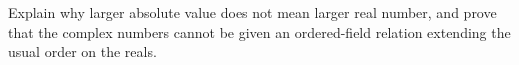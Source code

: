 Explain why larger absolute value does not mean larger real number, and prove that the complex numbers cannot be given an ordered-field relation extending the usual order on the reals.
